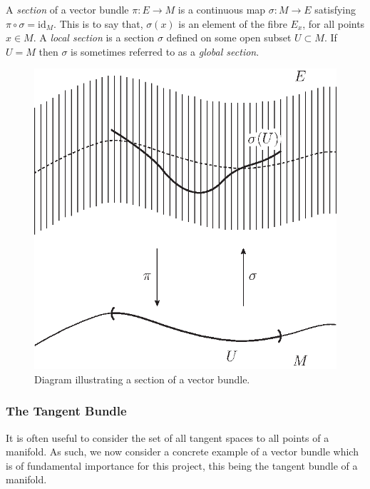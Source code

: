 \begin{definition}
A \textit{section} of a vector bundle $\pi:E\to M$ is a continuous map $\sigma:M\to E$ satisfying $\pi\circ\sigma=\mathrm{id}_M$. This is to say that, $\sigma(x)$ is an element of the fibre $E_x$, for all points $x\in M$. A \textit{local section} is a section $\sigma$ defined on some open subset $U\subset M$. If $U=M$ then $\sigma$ is sometimes referred to as a \textit{global section}.
\end{definition}

\begin{figure}[h!]
\centering
\includegraphics[scale=0.75]{fig/section-1}
\caption{Diagram illustrating a section of a vector bundle.}
\label{fig:section-1}
\end{figure}

\subsubsection{The Tangent Bundle}
It is often useful to consider the set of all tangent spaces to all points of a manifold. As such, we now consider a concrete example of a vector bundle which is of fundamental importance for this project, this being the tangent bundle of a manifold.

\pagebreak

